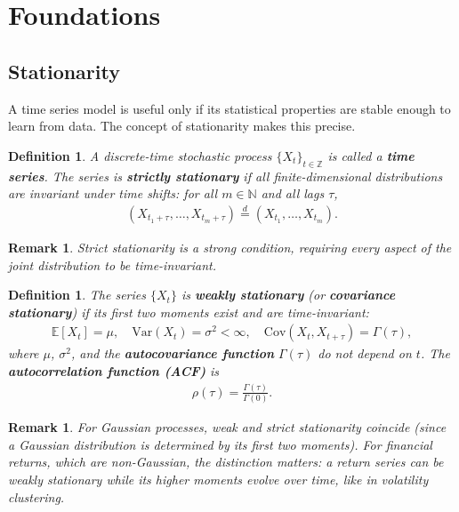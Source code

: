 \documentclass{report}
\theoremstyle{spacedplain}
\theoremstyle{spaceddefinition}
\newtheorem{definition}[theorem]{Definition}
\theoremstyle{spacedremark}
\newtheorem{remark}[theorem]{Remark}
\begin{document}
\section{Foundations}

\subsection{Stationarity}

A time series model is useful only if its statistical properties are stable enough to learn from data. The concept of stationarity makes this precise.

\begin{definition}
A discrete-time stochastic process $\{X_t\}_{t \in \mathbb{Z}}$ is called a \textbf{time series}. The series is \textbf{strictly stationary} if all finite-dimensional distributions are invariant under time shifts: for all $m \in \mathbb{N}$ and all lags $\tau$,
\begin{align}
    (X_{t_1+\tau}, \ldots, X_{t_m+\tau}) \overset{d}{=} (X_{t_1}, \ldots, X_{t_m}).
\end{align}
\end{definition}

\begin{remark}
Strict stationarity is a strong condition, requiring every aspect of the joint distribution to be time-invariant.
\end{remark}

\begin{definition}
The series $\{X_t\}$ is \textbf{weakly stationary} (or \textbf{covariance stationary}) if its first two moments exist and are time-invariant:
\begin{align}
    \mathbb{E}[X_t] = \mu, \quad
    \text{Var}(X_t) = \sigma^2 < \infty, \quad
    \text{Cov}(X_t, X_{t+\tau}) = \Gamma(\tau),
\end{align}
where $\mu$, $\sigma^2$, and the \textbf{autocovariance function} $\Gamma(\tau)$ do not depend on $t$. The \textbf{autocorrelation function (ACF)} is
\begin{align}
    \rho(\tau) = \frac{\Gamma(\tau)}{\Gamma(0)}.
\end{align}
\end{definition}

\begin{remark}
For Gaussian processes, weak and strict stationarity coincide (since a Gaussian distribution is determined by its first two moments). For financial returns, which are non-Gaussian, the distinction matters: a return series can be weakly stationary while its higher moments evolve over time, like in volatility clustering.
\end{remark}
\end{document}
